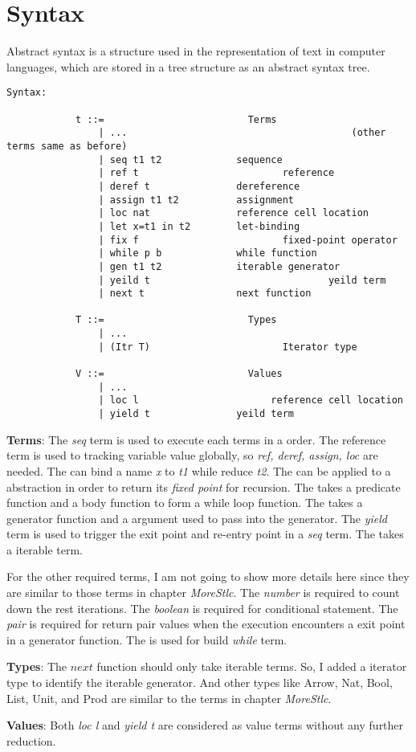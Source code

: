 \section{Syntax}
\label{sec:approach}
Abstract syntax is a structure used in the representation of text in computer languages, which are stored in a tree structure as an abstract syntax tree.
%
\begin{lstlisting}[basicstyle=\small]
Syntax:

			t ::=                		  Terms
				| ...										(other terms same as before)
				| seq t1 t2             sequence
				| ref t					   	    reference 
				| deref t               dereference
				| assign t1 t2          assignment
				| loc nat               reference cell location
				| let x=t1 in t2        let-binding
				| fix f   					    fixed-point operator
				| while p b             while function 
				| gen t1 t2             iterable generator
				| yeild t								yeild term
				| next t                next function

			T ::=                		  Types
				| ...               		
				| (Itr T)				        Iterator type
			
			V ::=                		  Values
				| ... 
				| loc l				          reference cell location
				| yield t               yeild term
\end{lstlisting}
%
\textbf{Terms}: The \textit{seq} term is used to execute each terms in a order. 
The reference term is used to tracking variable value globally, so \textit{ref, deref, assign, loc} are needed. The \lt can bind a name \textit{x} to \textit{t1} while reduce \textit{t2}. 
The \fix can be applied to a abstraction in order to return its \textit{fixed point} for recursion. 
The \while takes a predicate function and a body function to form a while loop function. 
The \gen takes a generator function and a argument used to pass into the generator. 
The \textit{yield} term is used to trigger the exit point and re-entry point in a \textit{seq} term. 
The \nt takes a iterable term.
%

For the other required terms, I am not going to show more details here since they are similar to those terms in chapter \textit{MoreStlc}. The \textit{number} is required to count down the rest iterations. The \textit{boolean} is required for conditional statement. The \textit{pair} is required for return pair values when the execution encounters a exit point in a generator function. The \fix is used for build \textit{while} term.

%
\textbf{Types}: The $next$ function should only take iterable terms. 
So, I added a iterator type to identify the iterable generator. 
And other types like Arrow, Nat, Bool, List, Unit, and Prod are similar to the terms in chapter \textit{MoreStlc}.

%
\textbf{Values}: Both \textit{loc l} and \textit{yield t} are considered as value terms without any further reduction.